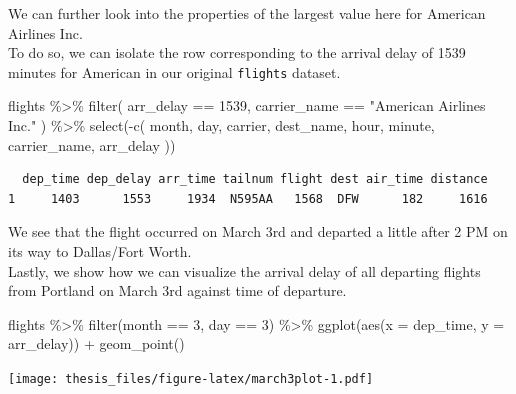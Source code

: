 \documentclass[12pt,oneside]{tisemthesis}
\newenvironment{Shaded}{\begin{snugshade}}{\end{snugshade}}
\newcommand{\AttributeTok}[1]{\textcolor[rgb]{0.77,0.63,0.00}{#1}}
\newcommand{\DecValTok}[1]{\textcolor[rgb]{0.00,0.00,0.81}{#1}}
\newcommand{\FunctionTok}[1]{\textcolor[rgb]{0.00,0.00,0.00}{#1}}
\newcommand{\NormalTok}[1]{#1}
\newcommand{\SpecialCharTok}[1]{\textcolor[rgb]{0.00,0.00,0.00}{#1}}
\newcommand{\StringTok}[1]{\textcolor[rgb]{0.31,0.60,0.02}{#1}}
\begin{document}
We can further look into the properties of the largest value here for American Airlines Inc.\\
To do so, we can isolate the row corresponding to the arrival delay of 1539 minutes for American in our original \texttt{flights} dataset.
\begin{Shaded}
\begin{Highlighting}[]
\NormalTok{flights }\SpecialCharTok{\%\textgreater{}\%}
  \FunctionTok{filter}\NormalTok{(}
\NormalTok{    arr\_delay }\SpecialCharTok{==} \DecValTok{1539}\NormalTok{,}
\NormalTok{    carrier\_name }\SpecialCharTok{==} \StringTok{"American Airlines Inc."}
\NormalTok{  ) }\SpecialCharTok{\%\textgreater{}\%}
  \FunctionTok{select}\NormalTok{(}\SpecialCharTok{{-}}\FunctionTok{c}\NormalTok{(}
\NormalTok{    month, day, carrier, dest\_name, hour,}
\NormalTok{    minute, carrier\_name, arr\_delay}
\NormalTok{  ))}
\end{Highlighting}
\end{Shaded}
\begin{verbatim}
  dep_time dep_delay arr_time tailnum flight dest air_time distance
1     1403      1553     1934  N595AA   1568  DFW      182     1616
\end{verbatim}
We see that the flight occurred on March 3rd and departed a little after 2 PM on its way to Dallas/Fort Worth.\\
Lastly, we show how we can visualize the arrival delay of all departing flights from Portland on March 3rd against time of departure.
\begin{Shaded}
\begin{Highlighting}[]
\NormalTok{flights }\SpecialCharTok{\%\textgreater{}\%}
  \FunctionTok{filter}\NormalTok{(month }\SpecialCharTok{==} \DecValTok{3}\NormalTok{, day }\SpecialCharTok{==} \DecValTok{3}\NormalTok{) }\SpecialCharTok{\%\textgreater{}\%}
  \FunctionTok{ggplot}\NormalTok{(}\FunctionTok{aes}\NormalTok{(}\AttributeTok{x =}\NormalTok{ dep\_time, }\AttributeTok{y =}\NormalTok{ arr\_delay)) }\SpecialCharTok{+}
  \FunctionTok{geom\_point}\NormalTok{()}
\end{Highlighting}
\end{Shaded}
\texttt{[image: thesis\_files/figure-latex/march3plot-1.pdf]}
\end{document}
